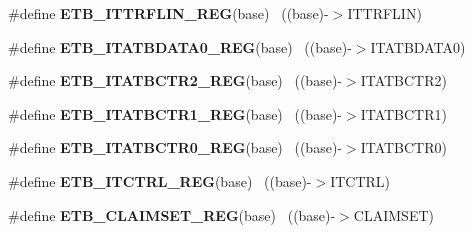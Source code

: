 \begin{DoxyCompactItemize}
\item 
\hypertarget{group___e_t_b___register___accessor___macros_ga65cca5b4e5cbb1449c410c34f2a6b385}{}\#define {\bfseries E\+T\+B\+\_\+\+I\+T\+T\+R\+F\+L\+I\+N\+\_\+\+R\+E\+G}(base)                                  ~((base)-\/$>$I\+T\+T\+R\+F\+L\+I\+N)\label{group___e_t_b___register___accessor___macros_ga65cca5b4e5cbb1449c410c34f2a6b385}

\item 
\hypertarget{group___e_t_b___register___accessor___macros_ga7ecb4f39f8ffa2c06f43631e68743e98}{}\#define {\bfseries E\+T\+B\+\_\+\+I\+T\+A\+T\+B\+D\+A\+T\+A0\+\_\+\+R\+E\+G}(base)                              ~((base)-\/$>$I\+T\+A\+T\+B\+D\+A\+T\+A0)\label{group___e_t_b___register___accessor___macros_ga7ecb4f39f8ffa2c06f43631e68743e98}

\item 
\hypertarget{group___e_t_b___register___accessor___macros_gad0d6ffa5e53198bd2fba7005da79f142}{}\#define {\bfseries E\+T\+B\+\_\+\+I\+T\+A\+T\+B\+C\+T\+R2\+\_\+\+R\+E\+G}(base)                                ~((base)-\/$>$I\+T\+A\+T\+B\+C\+T\+R2)\label{group___e_t_b___register___accessor___macros_gad0d6ffa5e53198bd2fba7005da79f142}

\item 
\hypertarget{group___e_t_b___register___accessor___macros_ga7cd1d5d047d0dac1a92e04f73c945e64}{}\#define {\bfseries E\+T\+B\+\_\+\+I\+T\+A\+T\+B\+C\+T\+R1\+\_\+\+R\+E\+G}(base)                                ~((base)-\/$>$I\+T\+A\+T\+B\+C\+T\+R1)\label{group___e_t_b___register___accessor___macros_ga7cd1d5d047d0dac1a92e04f73c945e64}

\item 
\hypertarget{group___e_t_b___register___accessor___macros_ga4e45d90262e36386bdf5f727f2430cb2}{}\#define {\bfseries E\+T\+B\+\_\+\+I\+T\+A\+T\+B\+C\+T\+R0\+\_\+\+R\+E\+G}(base)                                ~((base)-\/$>$I\+T\+A\+T\+B\+C\+T\+R0)\label{group___e_t_b___register___accessor___macros_ga4e45d90262e36386bdf5f727f2430cb2}

\item 
\hypertarget{group___e_t_b___register___accessor___macros_ga382e78742117de866d4a3cf641ac8ae2}{}\#define {\bfseries E\+T\+B\+\_\+\+I\+T\+C\+T\+R\+L\+\_\+\+R\+E\+G}(base)                                      ~((base)-\/$>$I\+T\+C\+T\+R\+L)\label{group___e_t_b___register___accessor___macros_ga382e78742117de866d4a3cf641ac8ae2}

\item 
\hypertarget{group___e_t_b___register___accessor___macros_ga53774f9d5d7a5be087ae544a728f4402}{}\#define {\bfseries E\+T\+B\+\_\+\+C\+L\+A\+I\+M\+S\+E\+T\+\_\+\+R\+E\+G}(base)                                  ~((base)-\/$>$C\+L\+A\+I\+M\+S\+E\+T)\label{group___e_t_b___register___accessor___macros_ga53774f9d5d7a5be087ae544a728f4402}


\end{DoxyCompactItemize}
